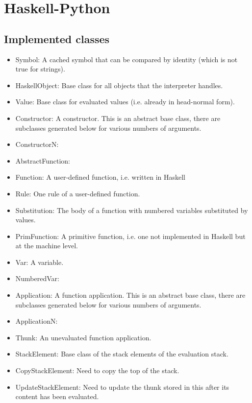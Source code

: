 
\section{Haskell-Python}

\subsection{Implemented classes}

\begin{itemize}

\item Symbol: 			 A cached symbol that can be compared by identity (which is not true for strings). 
\item HaskellObject: 		 Base class for all objects that the interpreter handles. 
\item Value:			 Base class for evaluated values (i.e. already in head-normal form). 
\item Constructor:		 A constructor. This is an abstract base class, there are subclasses generated below for various numbers of arguments.
\item ConstructorN:		 
\item AbstractFunction:	 
\item Function:		 	 A user-defined function, i.e. written in Haskell 
\item Rule:			 One rule of a user-defined function. 
\item Substitution:		 The body of a function with numbered variables substituted by values. 
\item PrimFunction:		 A primitive function, i.e. one not implemented in Haskell but at the machine level. 
\item Var:			 A variable.
\item NumberedVar:		 
\item Application:		 A function application. This is an abstract base class, there are subclasses generated below for various numbers of arguments. 
\item ApplicationN:		 
\item Thunk:			 An unevaluated function application. 
\item StackElement:		 Base class of the stack elements of the evaluation stack. 
\item CopyStackElement:	 	Need to copy the top of the stack. 
\item UpdateStackElement:	 Need to update the thunk stored in this after its content has been evaluated. 

\end{itemize}

